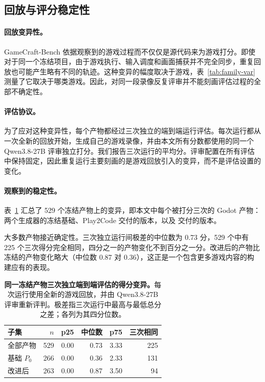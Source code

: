 \subsection{回放与评分稳定性}\label{app:stability}
\paragraph{回放变异性。}GameCraft-Bench 依据观察到的游戏过程而不仅仅是源代码来为游戏打分。即使对于同一个冻结项目，由于游戏执行、输入调度和画面捕获并不完全同步，重复回放也可能产生略有不同的轨迹。这种变异的幅度取决于游戏，表~\ref{tab:family-var} 测量了它取决于哪类游戏。因此，对同一段录像反复评审并不能刻画评估过程的全部不确定性。

\paragraph{评估协议。}为了应对这种变异性，每个产物都经过三次独立的端到端运行评估。每次运行都从一次全新的回放开始，生成自己的游戏录像，并由本文所有分数都使用的同一个 Qwen3.8-27B 评审独立打分。我们报告三次运行的平均分。评审配置在所有评估中保持固定，因此重复运行主要刻画的是游戏回放引入的变异，而不是评估设置的变化。

\paragraph{观察到的稳定性。}表~\ref{tab:stability} 汇总了 529 个冻结产物上的变异，即本文中每个被打分三次的 Godot 产物：两个生成器的冻结基础、Play2Code 交付的版本，以及 \rsig{} 交付的版本。

大多数产物接近确定性。三次独立运行间极差的中位数为 0.73 分，529 个中有 225 个三次得分完全相同，四分之一的产物变化不到百分之一分。改进后的产物比冻结的产物变化略大（中位数 0.87 对 0.36），这正是一个包含更多游戏内容的构建应有的表现。

\begin{table}[htbp]
\caption{\textbf{同一冻结产物三次独立端到端评估的得分变异。}每次运行使用全新的游戏回放，并由 Qwen3.8-27B 评审重新评判。极差指三次运行中最高与最低总分之差；各列为其四分位数。}
\label{tab:stability}
\centering\small
\begin{tabular}{@{}lrrrrr@{}}
\toprule
子集 & $n$ & p25 & 中位数 & p75 & 三次相同 \\
\midrule
全部产物 & 529 & 0.00 & 0.73 & 3.33 & 225 \\
基础 $P_0$ & 266 & 0.00 & 0.36 & 2.33 & 131 \\
改进后 & 263 & 0.00 & 0.87 & 3.50 & 94 \\
\bottomrule
\end{tabular}
\end{table}

